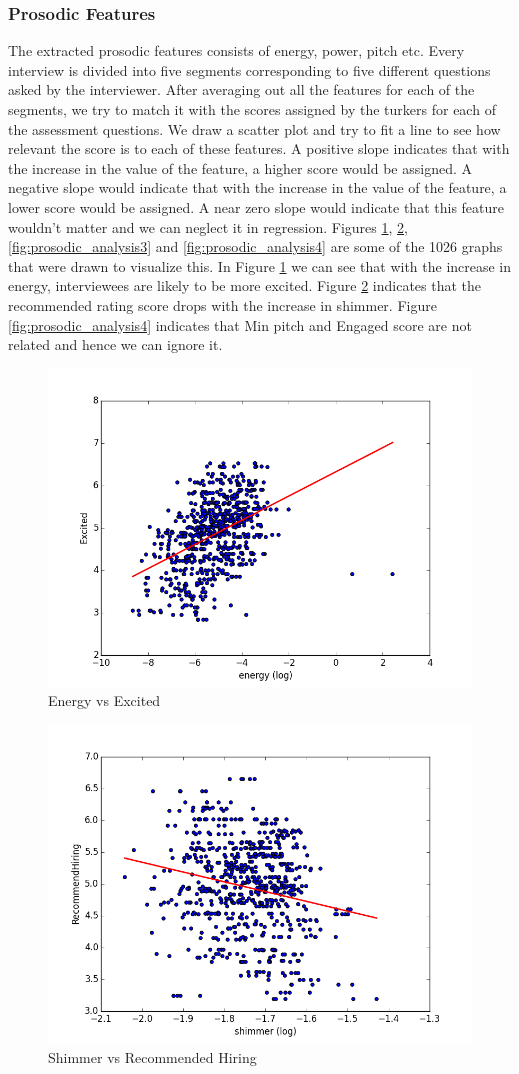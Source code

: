 \documentclass[11pt]{article}
\begin{document}
\subsubsection{Prosodic Features}
The extracted prosodic features consists of energy, power, pitch etc. Every interview is divided into five segments corresponding to five different questions asked by the interviewer. After averaging out all the features for each of the segments, we try to match it with the scores assigned by the turkers for each of the assessment questions. We draw a scatter plot and try to fit a line to see how relevant the score is to each of these features. A positive slope indicates that with the increase in the value of the feature, a higher score would be assigned. A negative slope would indicate that with the increase in the value of the feature, a lower score would be assigned. A near zero slope would indicate that this feature wouldn't matter and we can neglect it in regression. Figures \ref{fig:prosodic_analysis1}, \ref{fig:prosodic_analysis2}, \ref{fig:prosodic_analysis3} and \ref{fig:prosodic_analysis4} are some of the 1026 graphs that were drawn to visualize this. In Figure \ref{fig:prosodic_analysis1} we can see that with the increase in energy, interviewees are likely to be more excited. Figure \ref{fig:prosodic_analysis2} indicates that the recommended rating score drops with the increase in shimmer. Figure \ref{fig:prosodic_analysis4} indicates that Min pitch and Engaged score are not related and hence we can ignore it. 

\begin{figure}[H]
\begin{center}
\includegraphics[width=0.5\columnwidth]{figures/Excited and energy.png}
\caption{Energy vs Excited}
\label{fig:prosodic_analysis1}
\end{center}
\end{figure}

\begin{figure}[H]
\begin{center}
\includegraphics[width=0.5\columnwidth]{figures/RecommendHiring and shimmer.png}
\caption{Shimmer vs Recommended Hiring}
\label{fig:prosodic_analysis2}
\end{center}
\end{figure}
\end{document}

